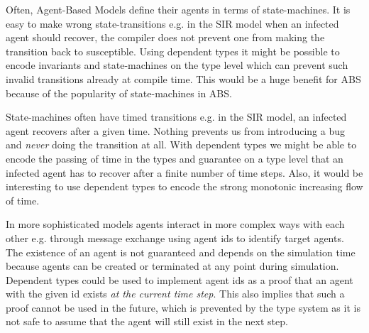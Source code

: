Often, Agent-Based Models define their agents in terms of state-machines. It is easy to make wrong state-transitions e.g. in the SIR model when an infected agent should recover, the compiler does not prevent one from making the transition back to susceptible. Using dependent types it might be possible to encode invariants and state-machines on the type level which can prevent such invalid transitions already at compile time. This would be a huge benefit for ABS because of the popularity of state-machines in ABS.

State-machines often have timed transitions e.g. in the SIR model, an infected agent recovers after a given time. Nothing prevents us from introducing a bug and \textit{never} doing the transition at all. With dependent types we might be able to encode the passing of time in the types and guarantee on a type level that an infected agent has to recover after a finite number of time steps. Also, it would be interesting to use dependent types to encode the strong monotonic increasing flow of time.
	
In more sophisticated models agents interact in more complex ways with each other e.g. through message exchange using agent ids to identify target agents. The existence of an agent is not guaranteed and depends on the simulation time because agents can be created or terminated at any point during simulation. Dependent types could be used to implement agent ids as a proof that an agent with the given id exists \textit{at the current time step}. This also implies that such a proof cannot be used in the future, which is prevented by the type system as it is not safe to assume that the agent will still exist in the next step. %



